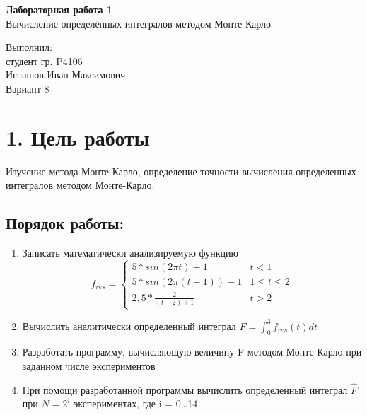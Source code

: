 \documentclass[12pt]{article}
\begin{document}
\begin{center}
	\LARGE 
	\textbf{Лабораторная работа 1}\\
	Вычисление определённых интегралов методом Монте-Карло
	\\[3\baselineskip]
\end{center}

\begin{flushright}
	\large
	Выполнил:\\
	студент гр. P4106\\
	Игнашов Иван Максимович\\
	Вариант 8\\
\end{flushright}

\newpage

 \section*{1. Цель работы}
Изучение метода Монте-Карло, определение точности вычисления определенных интегралов методом Монте-Карло.

\subsection*{Порядок работы:}
\begin{enumerate}
	\item Записать математически анализируемую функцию 
		\begin{equation}
			f_{res} = \begin{cases}
						5*sin(2 \pi t) + 1 &t < 1\\
						5*sin(2 \pi (t-1)) + 1 &1 \le t \le 2\\
						2,5* \frac{2}{(t-2) + 1} &t > 2
					  \end{cases}
		\end{equation}
	\item Вычислить аналитически определенный интеграл $F = \int_0^3 f_{res}(t)dt$
	\item Разработать программу, вычисляющую величину F методом Монте-Карло при
заданном числе экспериментов
	\item При помощи разработанной программы вычислить определенный интеграл $\hat{F}$ %
 при $N = 2^i$ экспериментах, где i = 0\dots14
\end{enumerate}

\newpage
\end{document}
